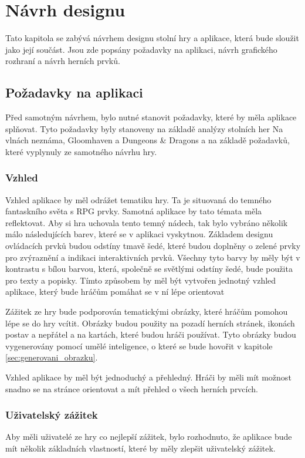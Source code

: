 \chapter{Návrh designu}
Tato kapitola se zabývá návrhem designu stolní hry a aplikace, která bude sloužit jako její součást. Jsou zde popsány požadavky na aplikaci, návrh grafického rozhraní a návrh herních prvků.

\section{Požadavky na aplikaci}
Před samotným návrhem, bylo nutné stanovit požadavky, které by měla aplikace splňovat. Tyto požadavky byly stanoveny na základě analýzy stolních her Na vlnách neznáma, Gloomhaven a Dungeons \& Dragons a na základě požadavků, které vyplynuly ze samotného návrhu hry.

\subsection{Vzhled}
Vzhled aplikace by měl odrážet tematiku hry. Ta je situovaná do temného fantaskního světa s RPG prvky. Samotná aplikace by tato témata měla reflektovat. Aby si hra uchovala tento temný nádech, tak bylo vybráno několik málo následujících barev, které se v aplikaci vyskytnou. Základem designu ovládacích prvků budou odstíny tmavě šedé, které budou doplněny o zelené prvky pro zvýraznění a indikaci interaktivních prvků. Všechny tyto barvy by měly být v kontrastu s bílou barvou, která, společně se světlými odstíny šedé, bude použita pro texty a popisky. Tímto způsobem by měl být vytvořen jednotný vzhled aplikace, který bude hráčům pomáhat se v ní lépe orientovat

Zážitek ze hry bude podporován tematickými obrázky, které hráčům pomohou lépe se do hry vcítit. Obrázky budou použity na pozadí herních stránek, ikonách postav a nepřátel a na kartách, které budou hráči používat. Tyto obrázky budou vygenerovány pomocí umělé inteligence, o které se bude hovořit v kapitole \ref{sec:generovani_obrazku}.

Vzhled aplikace by měl být jednoduchý a přehledný. Hráči by měli mít možnost snadno se na stránce orientovat a mít přehled o všech herních prvcích.

\subsection{Uživatelský zážitek}
Aby měli uživatelé ze hry co nejlepší zážitek, bylo rozhodnuto, že aplikace bude mít několik základních vlastností, které by měly zlepšit uživatelský zážitek.

